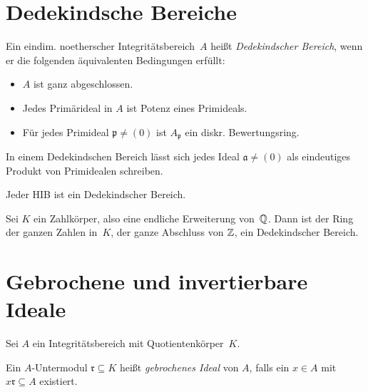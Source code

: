\documentclass{cheat-sheet}
\newcommand{\aaa}{\mathfrak{a}}
\newcommand{\ppp}{\mathfrak{p}}
\newcommand{\rrr}{\mathfrak{r}}
\begin{document}
\section{Dedekindsche Bereiche}


\begin{lemdefn}
  Ein eindim. noetherscher Integritätsbereich~$A$ heißt \emph{Dedekindscher Bereich}, wenn er die folgenden äquivalenten Bedingungen erfüllt:
  \begin{itemize}
    \item $A$ ist ganz abgeschlossen.
    \item Jedes Primärideal in $A$ ist Potenz eines Primideals.
    \item Für jedes Primideal $\ppp \neq (0)$ ist $A_\ppp$ ein diskr. Bewertungsring.
  \end{itemize}
\end{lemdefn}

\begin{kor}
  In einem Dedekindschen Bereich lässt sich jedes Ideal $\aaa \neq (0)$ als eindeutiges Produkt von Primidealen schreiben.
\end{kor}


\begin{bsp}
  Jeder HIB ist ein Dedekindscher Bereich.
\end{bsp}

\begin{satz}
  Sei $K$ ein Zahlkörper, also eine endliche Erweiterung von~$\mathbb{Q}$.
  Dann ist der Ring der ganzen Zahlen in~$K$, \dh{} der ganze Abschluss von $\mathbb{Z}$, ein Dedekindscher Bereich.
\end{satz}

\section{Gebrochene und invertierbare Ideale}


Sei $A$ ein Integritätsbereich mit Quotientenkörper~$K$.

\begin{defn}
  Ein $A$-Untermodul $\rrr \subseteq K$ heißt \emph{gebrochenes Ideal} von $A$, falls ein $x \in A$ mit $x \rrr \subseteq A$ existiert.
\end{defn}
\end{document}
